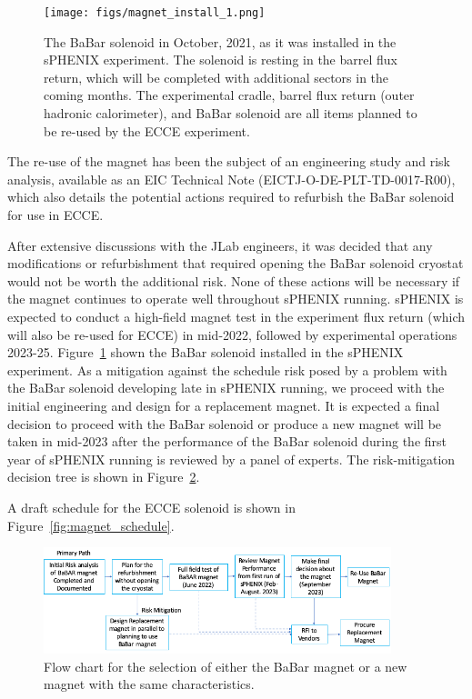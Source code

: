 \begin{figure}[h!tbp]
    \centering
    \texttt{[image: figs/magnet\_install\_1.png]}
    \caption{The BaBar solenoid in October, 2021, as it was installed in the sPHENIX experiment. The solenoid is resting in the barrel flux return, which will be completed with additional sectors in the coming months.  The experimental cradle, barrel flux return (outer hadronic calorimeter), and BaBar solenoid are all items planned to be re-used by the ECCE experiment.}
    \label{fig:BaBarInSPHENIX}
\end{figure}


% 
%

The re-use of the magnet has been the subject of an engineering study and risk analysis, available as an EIC Technical Note (EICTJ-O-DE-PLT-TD-0017-R00), which also details the potential actions required to refurbish the BaBar solenoid for use in ECCE. 

After extensive discussions with the JLab engineers, it was decided that any modifications or refurbishment that required opening the BaBar solenoid cryostat would not be worth the additional risk. None of these actions will be necessary if the magnet continues to operate well throughout sPHENIX running. sPHENIX is expected to conduct a high-field magnet test in the experiment flux return (which will also be re-used for ECCE) in mid-2022, followed by experimental operations 2023-25. Figure~\ref{fig:BaBarInSPHENIX} shown the BaBar solenoid installed in the sPHENIX experiment. As a mitigation against the schedule risk posed by a problem with the BaBar solenoid developing late in sPHENIX running, we proceed with the initial engineering and design for a replacement magnet. It is expected a final decision to proceed with the BaBar solenoid or produce a new magnet will be taken in mid-2023 after the performance of the BaBar solenoid during the first year of sPHENIX running is reviewed by a panel of experts.  The risk-mitigation decision tree is shown in Figure~\ref{fig:risk_tree}. 

A draft schedule for the ECCE solenoid is shown in Figure~\ref{fig:magnet_schedule}. 

\begin{figure}[h!tbp]
    \centering
    \includegraphics[width=0.9\textwidth]{figs/flow.png}
    \caption{
   Flow chart for the selection of either the BaBar magnet or a new magnet with the same characteristics.}
    \label{fig:risk_tree}
\end{figure}

